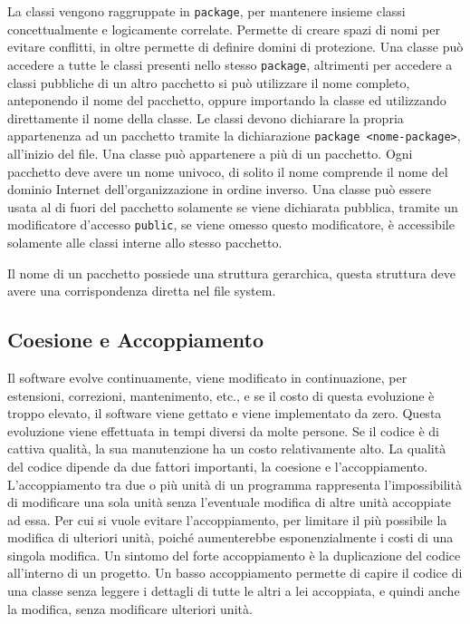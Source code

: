 \documentclass{article}
\numberwithin{equation}{subsection}
\begin{document}
La classi vengono raggruppate in \verb|package|, per mantenere insieme classi concettualmente e logicamente correlate. Permette di creare spazi di nomi per evitare conflitti, 
in oltre permette di definire domini di protezione. 
Una classe può accedere a tutte le classi presenti nello stesso \verb|package|, altrimenti per accedere a classi pubbliche di un altro pacchetto si può utilizzare il nome completo, 
anteponendo il nome del pacchetto, oppure importando la classe ed utilizzando direttamente il nome della classe. Le classi devono dichiarare la propria appartenenza ad un 
pacchetto tramite la dichiarazione \verb|package <nome-package>|, all'inizio del file. Una classe può appartenere a più di un pacchetto. Ogni pacchetto deve avere un nome univoco, 
di solito il nome comprende il nome del dominio Internet dell'organizzazione in ordine inverso. Una classe può essere usata al di fuori del pacchetto solamente se viene dichiarata 
pubblica, tramite un modificatore d'accesso \verb|public|, se viene omesso questo modificatore, è accessibile solamente alle classi interne allo stesso pacchetto.

Il nome di un pacchetto possiede una struttura gerarchica, questa struttura deve avere una corrispondenza diretta nel file system. 

\subsection{Coesione e Accoppiamento}

Il software evolve continuamente, viene modificato in continuazione, per estensioni, correzioni, mantenimento, etc., e se il costo di questa evoluzione è troppo elevato, il 
software viene gettato e viene implementato da zero. Questa evoluzione viene effettuata in tempi diversi da molte persone. 
Se il codice è di cattiva qualità, la sua manutenzione ha un costo relativamente alto. La qualità del codice dipende da due fattori importanti, la coesione e l'accoppiamento. 
L'accoppiamento tra due o più unità di un programma rappresenta l'impossibilità di modificare una sola unità senza l'eventuale modifica di altre unità accoppiate ad essa. 
Per cui si vuole evitare l'accoppiamento, per limitare il più possibile la modifica di ulteriori unità, poiché aumenterebbe esponenzialmente i costi di una singola modifica. 
Un sintomo del forte accoppiamento è la duplicazione del codice all'interno di un progetto. Un basso accoppiamento permette di capire il codice di una classe senza leggere 
i dettagli di tutte le altri a lei accoppiata, e quindi anche la modifica, senza modificare ulteriori unità. 
\end{document}
